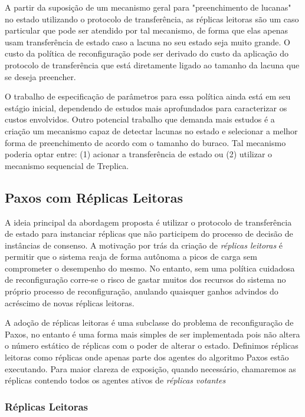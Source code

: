 A partir da suposição de um mecanismo geral para "preenchimento de lucanas" no estado
utilizando o protocolo de transferência, as réplicas leitoras são um caso particular que
pode ser atendido por tal mecanismo, de forma que elas apenas usam transferência de estado
caso a lacuna no seu estado seja muito grande. O custo da política de reconfiguração pode
ser derivado do custo da aplicação do protocolo de transferência que está diretamente
ligado ao tamanho da lacuna que se deseja preencher.

O trabalho de especificação de parâmetros para essa política ainda está em seu estágio
inicial, dependendo de estudos mais aprofundados para caracterizar os custos envolvidos.
Outro potencial trabalho que demanda mais estudos é a criação um mecanismo capaz de
detectar lacunas no estado e selecionar a melhor forma de preenchimento de acordo com o
tamanho do buraco. Tal mecanismo poderia optar entre: (1) acionar a transferência de
estado ou (2) utilizar o mecanismo sequencial de Treplica.

\subsection{Paxos com Réplicas Leitoras}\label{sec:replicas_leitoras}

A ideia principal da abordagem proposta é utilizar o protocolo de transferência de estado
para instanciar réplicas que não participem do processo de decisão de instâncias de
consenso. A motivação por trás da criação de \emph{réplicas leitoras} é permitir que o
sistema reaja de forma autônoma a picos de carga sem comprometer o desempenho do mesmo. No
entanto, sem uma política cuidadosa de reconfiguração corre-se o risco de gastar muitos
dos recursos do sistema no próprio processo de reconfiguração, anulando quaisquer ganhos
advindos do acréscimo de novas réplicas leitoras.

A adoção de réplicas leitoras é uma subclasse do problema de reconfiguração de Paxos, no
entanto é uma forma mais simples de ser implementada pois não altera o número estático de
réplicas com o poder de alterar o estado. Definimos réplicas leitoras como réplicas onde
apenas parte dos agentes do algoritmo Paxos estão executando. Para maior clareza de
exposição, quando necessário, chamaremos as réplicas contendo todos os agentes ativos de
\emph{réplicas votantes}

\subsubsection{Réplicas Leitoras}

